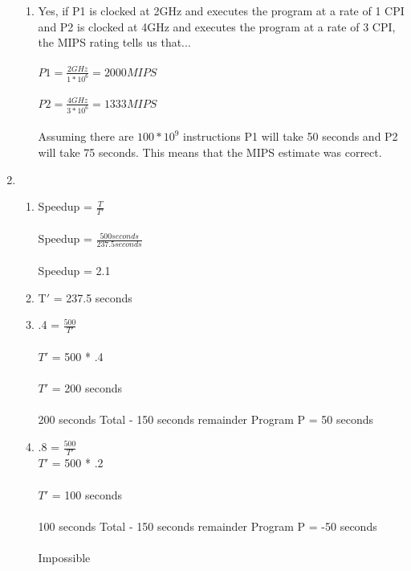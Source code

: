 \documentclass[a4paper]{article}
\begin{document}
\begin{enumerate}
\begin{enumerate}
\item Yes, if P1 is clocked at 2GHz and executes the program at a rate of 1 CPI and P2 is clocked at 4GHz and executes the program at a rate of 3 CPI, the MIPS rating tells us that...
\\
\\
$P1 = \frac {2GHz}{1 * 10^6} = 2000MIPS$
\\
\\
$P2 = \frac {4GHz}{3 * 10^6} = 1333MIPS$
\\
\\
Assuming there are $100 * 10^9$ instructions P1 will take 50 seconds and P2 will take 75 seconds. This means that the MIPS estimate was correct.
\end{enumerate}
\item
\begin{enumerate}
\item Speedup = $\frac{T}{T\prime}$
\\
\\
Speedup = $\frac{500 seconds}{237.5 seconds}$
\\
\\
Speedup = 2.1
\\
\item T$\prime$ = 237.5 seconds
\\
\item .4 = $\frac{500}{T\prime}$
\\
\\
$T\prime$ = 500 * .4
\\
\\
$T\prime$ = 200 seconds
\\
\\
200 seconds Total - 150 seconds remainder Program P = 50 seconds
\\
\item .8 = $\frac{500}{T\prime}$
\
\\
$T\prime$ = 500 * .2
\\
\\
$T\prime$ = 100 seconds
\\
\\
100 seconds Total - 150 seconds remainder Program P = -50 seconds
\\
\\
Impossible 
\end{enumerate}
\end{enumerate}
\end{document}
